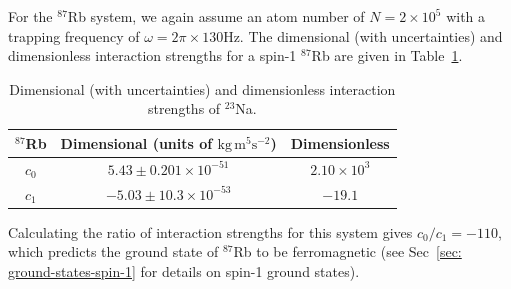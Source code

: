 For the \( ^{87}\)Rb system, we again assume an atom number of
\(N = 2\times 10^5\) with a trapping frequency of
\(\omega = 2\pi \times 130\)Hz.
The dimensional (with uncertainties) and dimensionless interaction strengths
for a spin-1 \( ^{87}\)Rb are given in
Table~\ref{table: spin-1-interactions-rb87}.
\begin{table}[!htbp]
    \centering
    \begin{tabular}{ccc}
        \toprule
        \( ^{87}\)Rb & Dimensional (units of \(\text{kg}\, \text{m}^5
        \text{s}^{-2}\)) & Dimensionless \\
        \midrule
        \(c_0\) & \(5.43 \pm 0.201 \times 10^{-51}\) & \(2.10\times10^3\) \\
        \(c_1\) & \(-5.03 \pm 10.3 \times 10^{-53}\) & \(-19.1\) \\
        \bottomrule
    \end{tabular}
    \caption{\label{table: spin-1-interactions-rb87}Dimensional (with
    uncertainties) and dimensionless interaction strengths of \( ^{23}\)Na.}
\end{table}
Calculating the ratio of interaction strengths for this system gives
\(c_0/c_1=-110 \), which predicts the ground state of \( ^{87}\)Rb to be
ferromagnetic (see
Sec~\ref{sec: ground-states-spin-1} for details on spin-1 ground states).

